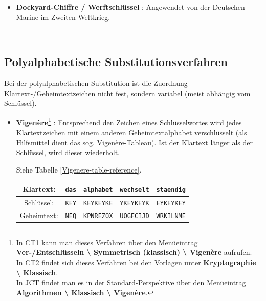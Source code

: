 \begin{refsegment}
\begin{itemize}
\item \textbf{Dockyard-Chiffre / Werftschlüssel} \cite{Savard1999}:
   Angewendet von der Deutschen Marine im Zweiten Weltkrieg.

\end{itemize}
~\\


\subsection{Polyalphabetische Substitutionsverfahren}

Bei der polyalphabetischen Substitution
ist die Zuordnung Klartext-/Geheimtextzeichen nicht fest, sondern variabel
(meist abhängig vom Schlüssel).

\begin{itemize}
\item \textbf{Vigen\`ere}\footnote{%
   In CT1 kann man dieses Verfahren über den Menüeintrag \textbf{
   Ver-/Entschlüsseln \textbackslash{} Symmetrisch (klassisch)
   \textbackslash{} Vigen\`ere} aufrufen.\\
   In CT2 findet sich dieses Verfahren bei den Vorlagen
   unter \textbf{Kryptographie \textbackslash{} Klassisch}.\\
   In JCT findet man es in der Standard-Perspektive
   über den Menüeintrag \textbf{Algorithmen \textbackslash{} Klassisch
   \textbackslash{} Vigen\`ere}.
   }
   \cite{Singh2001}:
   Entsprechend den Zeichen eines Schlüsselwortes wird jedes Klartextzeichen
   mit einem anderen Geheimtextalphabet verschlüsselt (als Hilfsmittel dient
   das sog. Vigen\`ere-Tableau). Ist der Klartext länger als der Schlüssel,
   wird dieser wiederholt.

   Siehe Tabelle \ref{Vigenere-table-reference}.

   \begin{table}[ht]

   \begin{center}
   \begin{tabular}{|c|c|c|c|c|}
   \hline
   Klartext:   & {\tt das} & {\tt alphabet} & {\tt wechselt} & {\tt staendig}\\
   \hline
   Schlüssel: & {\tt KEY} & {\tt KEYKEYKE} & {\tt YKEYKEYK} & {\tt EYKEYKEY}\\
   \hline
   Geheimtext: & {\tt NEQ} & {\tt KPNREZOX} & {\tt UOGFCIJD} & {\tt WRKILNME}\\
   \hline
   \end{tabular}
   \end{center}


\end{table}
\end{itemize}
\end{refsegment}
